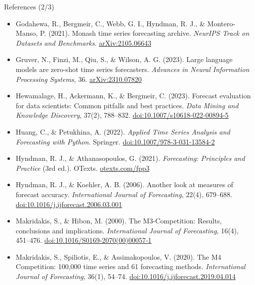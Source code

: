 \begin{frame}{References (2/3)}
\itemsize{\scriptsize}
\begin{itemize}
    \item Godahewa, R., Bergmeir, C., Webb, G. I., Hyndman, R. J., \& Montero-Manso, P. (2021). Monash time series forecasting archive. \textit{NeurIPS Track on Datasets and Benchmarks}. \href{https://arxiv.org/abs/2105.06643}{arXiv:2105.06643}
    \item Gruver, N., Finzi, M., Qiu, S., \& Wilson, A. G. (2023). Large language models are zero-shot time series forecasters. \textit{Advances in Neural Information Processing Systems}, 36. \href{https://arxiv.org/abs/2310.07820}{arXiv:2310.07820}
    \item Hewamalage, H., Ackermann, K., \& Bergmeir, C. (2023). Forecast evaluation for data scientists: Common pitfalls and best practices. \textit{Data Mining and Knowledge Discovery}, 37(2), 788--832. \href{https://doi.org/10.1007/s10618-022-00894-5}{doi:10.1007/s10618-022-00894-5}
    \item Huang, C., \& Petukhina, A. (2022). \textit{Applied Time Series Analysis and Forecasting with Python}. Springer. \href{https://doi.org/10.1007/978-3-031-13584-2}{doi:10.1007/978-3-031-13584-2}
    \item Hyndman, R. J., \& Athanasopoulos, G. (2021). \textit{Forecasting: Principles and Practice} (3rd ed.). OTexts. \href{https://otexts.com/fpp3/}{otexts.com/fpp3}
    \item Hyndman, R. J., \& Koehler, A. B. (2006). Another look at measures of forecast accuracy. \textit{International Journal of Forecasting}, 22(4), 679--688. \href{https://doi.org/10.1016/j.ijforecast.2006.03.001}{doi:10.1016/j.ijforecast.2006.03.001}
    \item Makridakis, S., \& Hibon, M. (2000). The M3-Competition: Results, conclusions and implications. \textit{International Journal of Forecasting}, 16(4), 451--476. \href{https://doi.org/10.1016/S0169-2070(00)00057-1}{doi:10.1016/S0169-2070(00)00057-1}
    \item Makridakis, S., Spiliotis, E., \& Assimakopoulos, V. (2020). The M4 Competition: 100,000 time series and 61 forecasting methods. \textit{International Journal of Forecasting}, 36(1), 54--74. \href{https://doi.org/10.1016/j.ijforecast.2019.04.014}{doi:10.1016/j.ijforecast.2019.04.014}
\end{itemize}
\end{frame}

